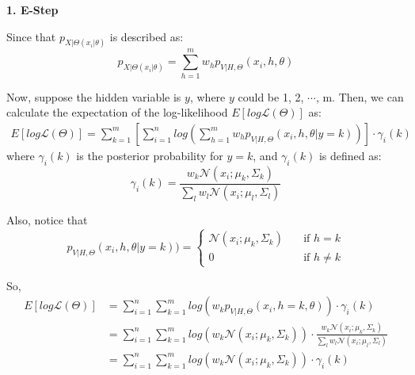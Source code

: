 \begin{description}
\item{\bf \large 1. E-Step}

Since that $p_{X|\Theta(x_i|\theta)}$ is described as:
\begin{equation}
	p_{X|\Theta(x_i|\theta)} = \sum_{h=1}^{m} w_h p_{V|H, \Theta}(x_i, h, \theta)
\end{equation}

Now, suppose the hidden variable is $y$, where $y$ could be 1, 2, $\cdots$, m. Then, we can calculate the expectation of the log-likelihood $E[log\mathcal{L}(\Theta)]$ as:
\begin{equation}
\begin{split}
E[log\mathcal{L}(\Theta)] = \sum_{k=1}^m [\sum_{i=1}^n log(\sum_{h=1}^m w_h p_{V|H, \Theta}(x_i, h, \theta | y=k))] \cdot \gamma_i(k)
\end{split} 
\end{equation}
where $\gamma_i(k)$ is the posterior probability for $y = k$, and $\gamma_i(k)$ is defined as:
\begin{equation}
	\gamma_i(k) = \frac{w_k \mathcal{N}(x_i; \mu_k, \Sigma_k)}{\sum_l w_l \mathcal{N}(x_i; \mu_l, \Sigma_l)}
\end{equation}

Also, notice that 
\begin{equation}
p_{V|H, \Theta}(x_i, h, \theta | y=k)) = 
	\begin{cases}
		\mathcal{N}(x_i; \mu_k, \Sigma_k)  & \quad \text{if } h = k \\
		0 & \quad \text{if } h \neq k
	\end{cases}
\end{equation}

So, 
\begin{equation}
\begin{split}
E[log\mathcal{L}(\Theta)] & = \sum_{i=1}^n \sum_{k=1}^m log(w_k p_{V|H, \Theta}(x_i, h=k, \theta)) \cdot \gamma_i(k) \\
						  & =  \sum_{i=1}^n \sum_{k=1}^m log(w_k \mathcal{N}(x_i; \mu_k, \Sigma_k))\cdot \frac{w_k \mathcal{N}(x_i; \mu_k, \Sigma_k)}{\sum_l w_l \mathcal{N}(x_i; \mu_l, \Sigma_l)} \\
						  & = \sum_{i=1}^n \sum_{k=1}^m log(w_k \mathcal{N}(x_i; \mu_k, \Sigma_k))\cdot \gamma_i(k)
\end{split} 
\end{equation}


\end{description}
